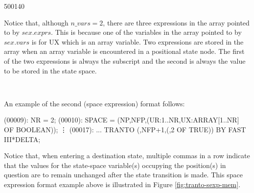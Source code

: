 \startfig
\begin{fast_picture}{500}{140}
\putuponebox\savFboxpos
{}\savHboxpos
{}
    \nextFbox{}
          \nextBbox{}
          \nextBbox{}
          \nextBbox{}
    \nextFbox{}
          \stackBbox
          \nextBbox\valbox{}
          \nextBbox\valbox{}
    \nextFbox{}
\nextHbox{}
          \nextBbox{}
\nextHbox{}
\nextHbox{}
\end{fast_picture}

Notice that, although $n\_vars=2$, there are three expressions in the
array pointed to by $sex.exprs$.   This is because one of the variables in the
array pointed to by $sex.vars$ is for UX which is an array variable.
Two expressions are
stored in the array when an array variable
is encountered in a positional state node.
The first of the two expressions is always the
subscript and
the second is always the value to be stored in the state space.
\begin{tabbing}
\\
\end{tabbing}


An example of the second (space expression) format follows:
\begin{logfileexample}
(00009): NR = 2;
(00010): SPACE = (NP,NFP,(UR:1..NR,UX:ARRAY[1..NR] OF BOOLEAN));
         \vdots
(00017):  ...  TRANTO (,NFP+1,(,2 OF TRUE)) BY FAST III*DELTA;
\end{logfileexample}
Notice that, when entering a destination state, multiple commas in a row
indicate that the values for the state-space variable(s) occupying
the position(s) in question are to remain unchanged after the state transition
is made.
This space expression format example above is
illustrated in Figure \ref{fig:tranto-sexp-mem}.

